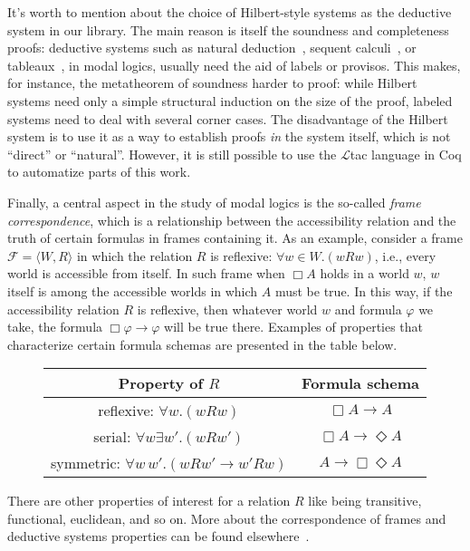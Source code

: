 \documentclass[3p,times]{elsarticle}
\begin{document}

It's worth to mention about the choice of Hilbert-style systems as the deductive system in our library.
The main reason is itself the soundness and completeness proofs: deductive systems such as natural
deduction~\cite{Russo_PMLD, basin.ea:labelled:1997, SVRS02-recipe}, sequent
calculi~\cite{Governatori00labelledmodal, 03-MSSV-fiblog19}, or tableaux~\cite{BrodaRusso05},
in modal logics, usually need the aid of labels or provisos. This makes, for instance, the
metatheorem of soundness harder to proof: while Hilbert systems need only a simple structural induction
on the size of the proof, labeled systems need to deal with several corner cases. The disadvantage of the
Hilbert system is to use it as a way to establish proofs \emph{in} the system itself, which is not
``direct'' or ``natural''. However, it is still possible to use the $\mathcal{L}$tac language in Coq
to automatize parts of this work.


Finally, a central aspect in the study of modal logics is the so-called \emph{frame
  correspondence}, which is a relationship between the
accessibility relation and the truth of certain formulas in frames containing
it. As an example, consider a frame $\mathcal{F} = \langle W,R
\rangle$ in which the relation $R$ is reflexive: $\forall w \in W. (wRw)$, i.e.,
every world is accessible from itself. In such frame when $\Box A$ holds in
a world $w$, $w$ itself is among the accessible worlds in which $A$ must be true.
In this way, if the accessibility relation $R$ is reflexive, then whatever world
$w$ and formula $\varphi$ we take, the formula $\Box \varphi \to \varphi$ will
be true there. Examples of properties that characterize certain formula schemas are
presented in the table below.

\begin{figure}[H]
\begin{tabular}{|c|c|}
  \hline
  Property of $R$                          & Formula schema \\ \hline
  reflexive: $\forall w.(wRw)$               & $\Box A \to A$ \\
  serial: $\forall w\exists w'. (wRw')$      & $\Box A \to \Diamond A$ \\
  symmetric: $\forall w\,w'.(wRw' \to w'Rw)$ & $A \to \Box\Diamond A$ \\
  \hline
\end{tabular}
\centering
\end{figure}
There are other properties of interest for a relation $R$ like being
transitive, functional, euclidean, and so on. More about the correspondence
of frames and deductive systems properties can be found elsewhere~\cite{Chellas,blackburn}.
\end{document}
